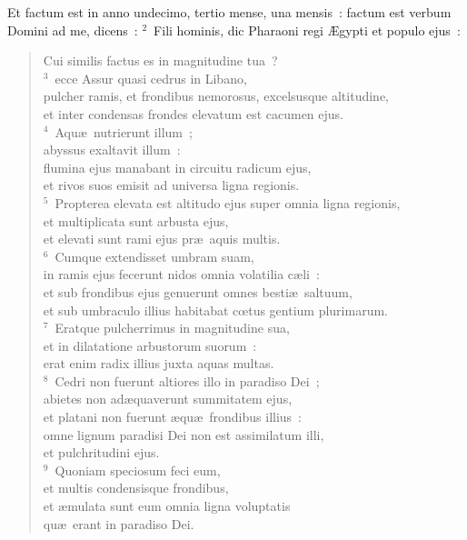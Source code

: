 \bchapter
\lettrine[lines=3,image=true,loversize=0.05,lraise=-0.03]{E}{}t factum est in anno undecimo, tertio mense, una mensis~: factum est verbum Domini ad me, dicens~:
${}^{2}$~Fili hominis, dic Pharaoni regi \AE gypti et populo ejus~: \begin{flushleft}\begin{verse}Cui similis factus es in magnitudine tua~?\\
${}^{3}$~ecce Assur quasi cedrus in Libano,\\ pulcher ramis, et frondibus nemorosus, excelsusque altitudine,\\ et inter condensas frondes elevatum est cacumen ejus.\\
${}^{4}$~Aqu\ae\ nutrierunt illum~;\\ abyssus exaltavit illum~:\\ flumina ejus manabant in circuitu radicum ejus,\\ et rivos suos emisit ad universa ligna regionis.\\
${}^{5}$~Propterea elevata est altitudo ejus super omnia ligna regionis,\\ et multiplicata sunt arbusta ejus,\\ et elevati sunt rami ejus pr\ae\ aquis multis.\\
${}^{6}$~Cumque extendisset umbram suam,\\ in ramis ejus fecerunt nidos omnia volatilia c\ae li~:\\ et sub frondibus ejus genuerunt omnes besti\ae\ saltuum,\\ et sub umbraculo illius habitabat cœtus gentium plurimarum.\\
${}^{7}$~Eratque pulcherrimus in magnitudine sua,\\ et in dilatatione arbustorum suorum~:\\ erat enim radix illius juxta aquas multas.\\
${}^{8}$~Cedri non fuerunt altiores illo in paradiso Dei~;\\ abietes non ad\ae quaverunt summitatem ejus,\\ et platani non fuerunt \ae qu\ae\ frondibus illius~:\\ omne lignum paradisi Dei non est assimilatum illi,\\ et pulchritudini ejus.\\
${}^{9}$~Quoniam speciosum feci eum,\\ et multis condensisque frondibus,\\ et \ae mulata sunt eum omnia ligna voluptatis\\ qu\ae\ erant in paradiso Dei.\end{verse}\end{flushleft}


